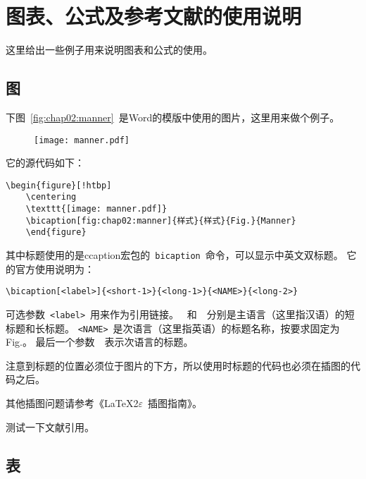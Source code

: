 ﻿%

\chapter{图表、公式及参考文献的使用说明}
\label{chap02}

这里给出一些例子用来说明图表和公式的使用。

    \section{图}
    \label{chap02:figure}
    下图~\ref{fig:chap02:manner}~是Word的模版中使用的图片，这里用来做个例子。

    \begin{figure}[!htbp]
        \centering
        \texttt{[image: manner.pdf]}
    \end{figure}

    它的源代码如下：
\begin{Verbatim}[fontsize=\footnotesize, frame=single, baselinestretch=1]
    \begin{figure}[!htbp]
    \centering
    \texttt{[image: manner.pdf]}
    \bicaption[fig:chap02:manner]{样式}{样式}{Fig.}{Manner}
    \end{figure}
\end{Verbatim}

    其中标题使用的是ccaption宏包的~\texttt{\footnotesize bicaption}~命令，可以显示中英文双标题。
    它的官方使用说明为：
\begin{Verbatim}[fontsize=\footnotesize, frame=single, baselinestretch=1]
    \bicaption[<label>]{<short-1>}{<long-1>}{<NAME>}{<long-2>}
\end{Verbatim}
    可选参数~\texttt{\footnotesize <label>}~用来作为引用链接。
    \texttt{}~和~\texttt{}~分别是主语言（这里指汉语）的短标题和长标题。
    \texttt{\footnotesize <NAME>}~是次语言（这里指英语）的标题名称，按要求固定为Fig.。
    最后一个参数~\texttt{}~表示次语言的标题。

    注意到标题的位置必须位于图片的下方，所以使用时标题的代码也必须在插图的代码之后。

    其他插图问题请参考《{\LaTeX 2$\varepsilon$}~插图指南》。

    测试一下文献引用。

    \section{表}
    \label{chap02:table}

